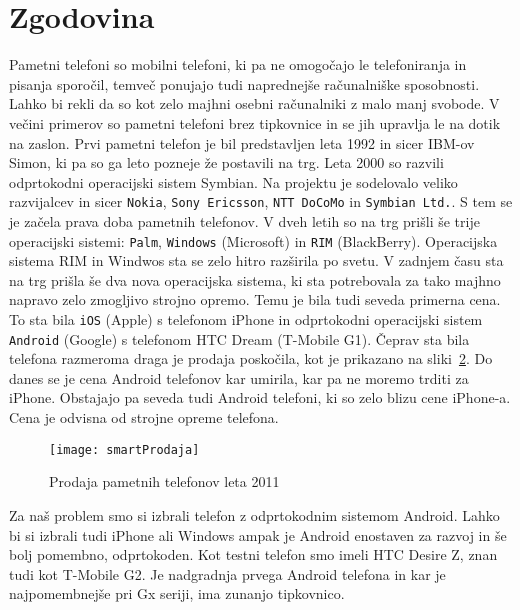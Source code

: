 \documentclass[a4paper, 12pt]{book}
\begin{document}
\section{Zgodovina}
\begin{figure}[h]
	\centering
	 \hfill
	 \hfill
	 \hfill
	\label{picRS232}
\end{figure}
Pametni telefoni so mobilni telefoni, ki pa ne omogočajo le telefoniranja in pisanja sporočil, temveč ponujajo tudi naprednejše računalniške sposobnosti. Lahko bi rekli da so kot zelo majhni osebni računalniki z malo manj svobode. V večini primerov so pametni telefoni brez tipkovnice in se jih upravlja le na dotik na zaslon. Prvi pametni telefon je bil predstavljen leta 1992 in sicer IBM-ov Simon, ki pa so ga leto pozneje že postavili na trg. Leta 2000 so razvili odprtokodni operacijski sistem Symbian. Na projektu je sodelovalo veliko razvijalcev in sicer {\tt Nokia}, {\tt Sony Ericsson}, {\tt NTT DoCoMo} in {\tt Symbian Ltd.}. S tem se je začela prava doba pametnih telefonov. V dveh letih so na trg prišli še trije operacijski sistemi: {\tt Palm}, {\tt Windows} (Microsoft) in {\tt RIM} (BlackBerry). Operacijska sistema RIM in Windwos sta se zelo hitro razširila po svetu. V zadnjem času sta na trg prišla še dva nova operacijska sistema, ki sta potrebovala za tako majhno napravo zelo zmogljivo strojno opremo. Temu je bila tudi seveda primerna cena. To sta bila {\tt iOS} (Apple) s telefonom iPhone in odprtokodni operacijski sistem {\tt Android} (Google) s telefonom HTC Dream (T-Mobile G1). Čeprav sta bila telefona razmeroma draga je prodaja poskočila, kot je prikazano na sliki~\ref{picsmartProdaja}. Do danes se je cena Android telefonov kar umirila, kar pa ne moremo trditi za iPhone. Obstajajo pa seveda tudi Android telefoni, ki so zelo blizu cene iPhone-a. Cena je odvisna od strojne opreme telefona.~\cite{bibSmartPhoneWiki}

\begin{figure}[h]
	\centering
	\texttt{[image: smartProdaja]}
	\caption{Prodaja pametnih telefonov leta 2011~\cite{bibSmartPhoneWiki}}
	\label{picsmartProdaja}
\end{figure}

Za naš problem smo si izbrali telefon z odprtokodnim sistemom Android. Lahko bi si izbrali tudi iPhone ali Windows ampak je Android enostaven za razvoj in še bolj pomembno, odprtokoden. Kot testni telefon smo imeli HTC Desire Z, znan tudi kot T-Mobile G2. Je nadgradnja prvega Android telefona in kar je najpomembnejše pri Gx seriji, ima zunanjo tipkovnico. 
\end{document}
